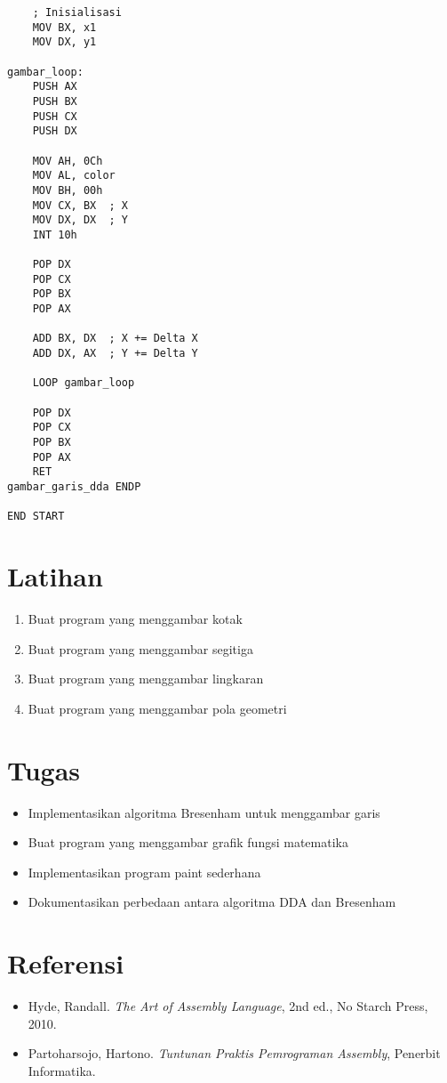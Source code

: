 \begin{verbatim}
    ; Inisialisasi
    MOV BX, x1
    MOV DX, y1
    
gambar_loop:
    PUSH AX
    PUSH BX
    PUSH CX
    PUSH DX
    
    MOV AH, 0Ch
    MOV AL, color
    MOV BH, 00h
    MOV CX, BX  ; X
    MOV DX, DX  ; Y
    INT 10h
    
    POP DX
    POP CX
    POP BX
    POP AX
    
    ADD BX, DX  ; X += Delta X
    ADD DX, AX  ; Y += Delta Y
    
    LOOP gambar_loop
    
    POP DX
    POP CX
    POP BX
    POP AX
    RET
gambar_garis_dda ENDP

END START
\end{verbatim}

\section{Latihan}
\begin{enumerate}
\item Buat program yang menggambar kotak
\item Buat program yang menggambar segitiga
\item Buat program yang menggambar lingkaran
\item Buat program yang menggambar pola geometri
\end{enumerate}

\section{Tugas}
\begin{itemize}
\item Implementasikan algoritma Bresenham untuk menggambar garis
\item Buat program yang menggambar grafik fungsi matematika
\item Implementasikan program paint sederhana
\item Dokumentasikan perbedaan antara algoritma DDA dan Bresenham
\end{itemize}

\section{Referensi}
\begin{itemize}
\item Hyde, Randall. \textit{The Art of Assembly Language}, 2nd ed., No Starch Press, 2010.
\item Partoharsojo, Hartono. \textit{Tuntunan Praktis Pemrograman Assembly}, Penerbit Informatika.
\end{itemize}

